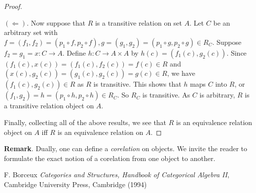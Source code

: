 \documentclass[12pt]{article}
\begin{document}
\begin{proof}
\begin{enumerate}
$(\Leftarrow)$.  Now suppose that $R$ is a transitive relation on set $A$.  Let $C$ be an arbitrary set with $f=(f_1,f_2)=(p_1\circ f,p_2\circ f), g=(g_1,g_2)=(p_1\circ g,p_2\circ g)\in R_C$.  Suppose $f_2=g_1=x:C\to A$.  Define $h:C\to A\times A$ by $h(c)=(f_1(c),g_2(c))$.  Since $(f_1(c),x(c))=(f_1(c),f_2(c))=f(c) \in R$ and $(x(c),g_2(c))= (g_1(c),g_2(c))=g(c)\in R$, we have $(f_1(c),g_2(c))\in R$ as $R$ is transitive.  This shows that $h$ maps $C$ into $R$, or $(f_1,g_2)=h=(p_1\circ h,p_2\circ h)\in R_C$.  So $R_C$ is transitive.  As $C$ is arbitrary, $R$ is a transitive relation object on $A$.
\end{enumerate}
Finally, collecting all of the above results, we see that $R$ is an equivalence relation object on $A$ iff $R$ is an equivalence relation on $A$.
\end{proof}

\textbf{Remark}.  Dually, one can define a \emph{corelation} on objects.  We invite the reader to formulate the exact notion of a corelation from one object to another.

\begin{thebibliography}{9}
 F. Borceux \emph{Categories and Structures, Handbook of Categorical Algebra II}, Cambridge University Press, Cambridge (1994)
\end{thebibliography}
\end{document}
